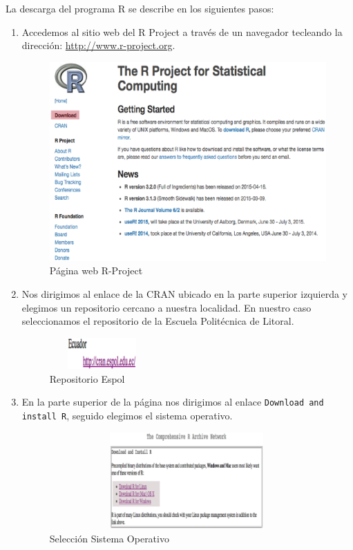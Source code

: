 \documentclass[11pt,a4paper,oneside]{book}\usepackage[]{graphicx}\usepackage[]{color}
\begin{document}
La descarga del programa R se describe en los siguientes pasos:
\begin{enumerate}
  \item Accedemos al sitio web del R Project a través de un navegador tecleando la dirección: \url{http://www.r-project.org}.
  \begin{figure}[H]
    \centering
    \includegraphics[scale=.45]{figuras/install1.eps}
    \caption{Página web R-Project}
    \label{rproject}
  \end{figure}
  
  \item Nos dirigimos al enlace de la CRAN ubicado en la parte superior izquierda y elegimos un repositorio cercano a nuestra localidad. En nuestro caso seleccionamos el repositorio de la Escuela Politécnica de Litoral.
  \begin{figure}[H]
    \centering
    \includegraphics[width=4cm,height=1.2cm]{figuras/install2.eps}
    \caption{Repositorio Espol}
    \label{respol}
  \end{figure}
  
  \item En la parte superior de la página nos dirigimos al enlace \texttt{Download and install R}, seguido elegimos el sistema operativo.
  \begin{figure}[H]
    \centering
    \includegraphics[width=10.5cm,height=3.7cm]{figuras/install3.eps}
    \caption{Selección Sistema Operativo}
    \label{soperativo}
  \end{figure}
  

\end{enumerate}
\end{document}
